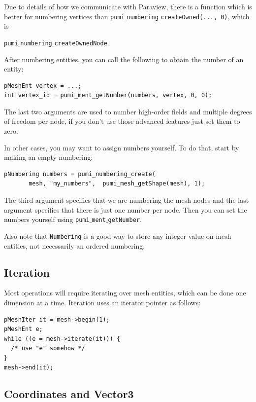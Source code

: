 \documentclass{article}
\begin{document}
Due to details of how we communicate with Paraview, there is a
function which is better for numbering vertices than
\texttt{pumi$\_$numbering$\_$createOwned(..., 0)}, which is
{\texttt{pumi$\_$numbering$\_$createOwnedNode}.

After numbering entities, you can call the following to obtain the number of an
entity:

\begin{lstlisting}
pMeshEnt vertex = ...;
int vertex_id = pumi_ment_getNumber(numbers, vertex, 0, 0);
\end{lstlisting}

The last two arguments are used to number high-order fields and
multiple degrees of freedom per node, if you don't use those
advanced features just set them to zero.

In other cases, you may want to assign numbers yourself.
To do that, start by making an empty numbering:

\begin{lstlisting}
pNumbering numbers = pumi_numbering_create(
       mesh, "my_numbers",  pumi_mesh_getShape(mesh), 1);
\end{lstlisting}

The third argument specifies that we are numbering the mesh
nodes and the last argument specifies that there is just one
number per node.
Then you can set the numbers yourself using \texttt{pumi$\_$ment$\_$getNumber}.

Also note that \texttt{Numbering} is a good way to store
any integer value on mesh entities, not necessarily an
ordered numbering.

\subsection{Iteration}

Most operations will require iterating over mesh entities,
which can be done one dimension at a time.
Iteration uses an iterator pointer as follows:

\begin{lstlisting}
pMeshIter it = mesh->begin(1);
pMeshEnt e;
while ((e = mesh->iterate(it))) {
  /* use "e" somehow */
}
mesh->end(it);
\end{lstlisting}

\subsection{Coordinates and Vector3}

}
\end{document}
